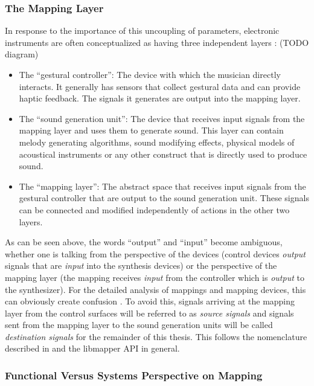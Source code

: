 	\subsubsection{The Mapping Layer}

In response to the importance of this uncoupling of parameters, electronic instruments are often conceptualized as having three independent layers \cite{gestural_control_sound_synthesis}: (TODO diagram)

	\begin{itemize}
		\item The ``gestural controller'': The device with which the musician directly interacts. It generally has sensors that collect gestural data and can provide haptic feedback. The signals it generates are output into the mapping layer.
		\item The ``sound generation unit'': The device that receives input signals from the mapping layer and uses them to generate sound. This layer can contain melody generating algorithms, sound modifying effects, physical models of acoustical instruments or any other construct that is directly used to produce sound.
		\item The ``mapping layer'': The abstract space that receives input signals from the gestural controller that are output to the sound generation unit. These signals can be connected and modified independently of actions in the other two layers.
	\end{itemize}

As can be seen above, the words ``output'' and ``input'' become ambiguous, whether one is talking from the perspective of the devices (control devices \emph{output} signals that are \emph{input} into the synthesis devices) or the perspective of the mapping layer (the mapping receives \emph{input} from the controller which is \emph{output} to the synthesizer). For the detailed analysis of mappings and mapping devices, this can obviously create confusion \cite{vizmapper}. To avoid this, signals arriving at the mapping layer from the control surfaces will be referred to as \emph{source signals} and signals sent from the mapping layer to the sound generation units will be called \emph{destination signals} for the remainder of this thesis. This follows the nomenclature described in  and the libmapper API in general.

	\subsubsection{Functional Versus Systems Perspective on Mapping}

